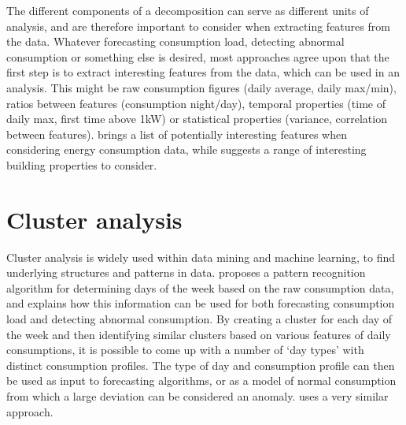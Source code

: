 The different components of a decomposition can serve as different units of analysis, and are therefore important to consider when extracting features from the data. Whatever forecasting consumption load, detecting abnormal consumption or something else is desired, most approaches agree upon that the first step is to extract interesting features from the data, which can be used in an analysis. This might be raw consumption figures (daily average, daily max/min), ratios between features (consumption night/day), temporal properties (time of daily max, first time above 1kW) or statistical properties (variance, correlation between features). \cite{Benchmarking1} brings a list of potentially interesting features when considering energy consumption data, while \cite{Benchmarking2} suggests a range of interesting building properties to consider. 
\section{Cluster analysis}
Cluster analysis is widely used within data mining and machine learning, to find underlying structures and patterns in data. \cite{faultdetec4} proposes a pattern recognition algorithm for determining days of the week based on the raw consumption data, and explains how this information can be used for both forecasting consumption load and detecting abnormal consumption. By creating a cluster for each day of the week and then identifying similar clusters based on various features of daily consumptions, it is possible to come up with a number of ‘day types’ with distinct consumption profiles. The type of day and consumption profile can then be used as input to forecasting algorithms, or as a model of normal consumption from which a large deviation can be considered an anomaly. \cite{faultdetec2} uses a very similar approach.

